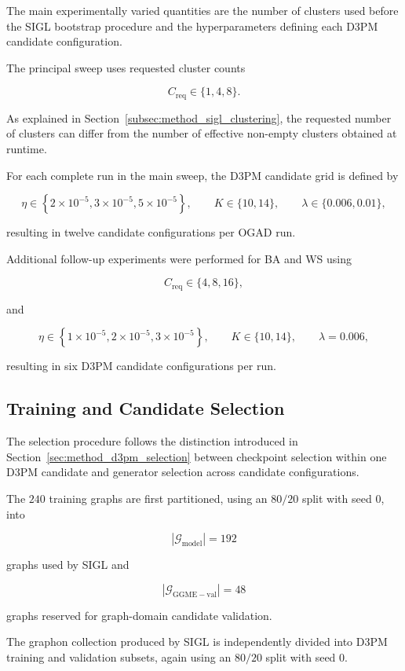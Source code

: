 The main experimentally varied quantities are the number of clusters used before the SIGL bootstrap procedure and the hyperparameters defining each D3PM candidate configuration.

The principal sweep uses requested cluster counts

\[
C_{\mathrm{req}}\in\{1,4,8\}.
\]

As explained in Section~\ref{subsec:method_sigl_clustering}, the requested number of clusters can differ from the number of effective non-empty clusters obtained at runtime.

For each complete run in the main sweep, the D3PM candidate grid is defined by

\[
\eta
\in
\left\{
2\times10^{-5},
3\times10^{-5},
5\times10^{-5}
\right\},
\qquad
K\in\{10,14\},
\qquad
\lambda\in\{0.006,0.01\},
\]

resulting in twelve candidate configurations per OGAD run.

Additional follow-up experiments were performed for BA and WS using

\[
C_{\mathrm{req}}\in\{4,8,16\},
\]

and

\[
\eta
\in
\left\{
1\times10^{-5},
2\times10^{-5},
3\times10^{-5}
\right\},
\qquad
K\in\{10,14\},
\qquad
\lambda=0.006,
\]

resulting in six D3PM candidate configurations per run.


\subsection{Training and Candidate Selection}
\label{subsec:exp_candidate_selection}

The selection procedure follows the distinction introduced in Section~\ref{sec:method_d3pm_selection} between checkpoint selection within one D3PM candidate and generator selection across candidate configurations.

The \(240\) training graphs are first partitioned, using an \(80/20\) split with seed \(0\), into

\[
|\mathcal{G}_{\mathrm{model}}|=192
\]

graphs used by SIGL and

\[
|\mathcal{G}_{\mathrm{GGME-val}}|=48
\]

graphs reserved for graph-domain candidate validation.

The graphon collection produced by SIGL is independently divided into D3PM training and validation subsets, again using an \(80/20\) split with seed \(0\).

